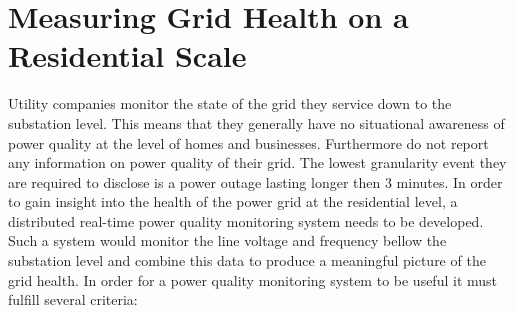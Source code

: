 \section{Measuring Grid Health on a Residential Scale}
Utility companies monitor the state of the grid they service down to the substation level. This means that they generally have no situational awareness of power quality at the
level of homes and businesses. Furthermore do not report any information on power quality of their grid. The lowest granularity event they are
required to disclose is a power outage lasting longer then 3 minutes. In order to gain insight into the health of the power grid at the residential level, a distributed
real-time power quality monitoring system needs to be developed. Such a system would monitor the line voltage and frequency bellow the substation level and combine
this data to produce a meaningful picture of the grid health. In order for a power quality monitoring system to be useful it must fulfill several criteria:
